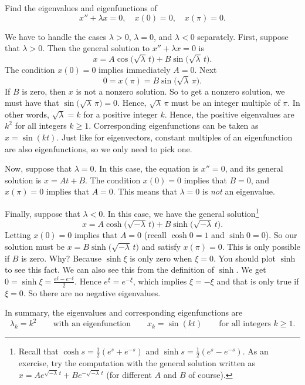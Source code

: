 \begin{example} \label{bvp:eig1ex}
Find the eigenvalues and eigenfunctions of
\begin{equation*}
x'' + \lambda x = 0, \quad x(0) = 0, \quad x(\pi) = 0 .
\end{equation*}

We have to handle
the cases $\lambda > 0$, $\lambda = 0$, and $\lambda < 0$ separately.
First, suppose that $\lambda > 0$.  Then
the general solution to $x''+\lambda x = 0$ is
\begin{equation*}
x = A \cos \bigl( \sqrt{\lambda}\, t\bigr)
+ B \sin \bigl( \sqrt{\lambda}\, t\bigr).
\end{equation*}
The condition $x(0) = 0$ implies immediately $A = 0$.
Next
\begin{equation*}
0 = x(\pi) = B \sin \bigl( \sqrt{\lambda}\, \pi \bigr) .
\end{equation*}
If $B$ is zero, then $x$ is not a nonzero solution.  So to get a nonzero
solution, we must have that $\sin \bigl( \sqrt{\lambda}\, \pi\bigr) = 0$.  Hence,
$\sqrt{\lambda}\, \pi$ must be an integer multiple of $\pi$.
In other words, $\sqrt{\lambda} = k$ for a positive integer $k$.
Hence, the positive eigenvalues are
$k^2$ for all integers $k \geq 1$.  Corresponding eigenfunctions
can be taken as $x=\sin (k t)$.  Just like for eigenvectors, constant
multiples of an eigenfunction are also eigenfunctions,
so we only need to pick one.

Now, suppose that $\lambda = 0$.  In this case, the equation is $x'' = 0$,
and its general solution is $x = At + B$.  The condition $x(0) = 0$ implies
that $B=0$, and $x(\pi) = 0$ implies that $A = 0$.  This means that $\lambda
= 0$ is \emph{not} an eigenvalue.

Finally, suppose that $\lambda < 0$.  In this case, we have the general
solution\footnote{Recall that
$\cosh s = \frac{1}{2}(e^s+e^{-s})$
and
$\sinh s = \frac{1}{2}(e^s-e^{-s})$.  As an exercise,
try the computation with the general solution written as
$x = A e^{\sqrt{-\lambda}\, t} + B e^{-\sqrt{-\lambda}\, t}$ (for
different $A$ and $B$ of course).}
\begin{equation*}
x = A \cosh \bigl( \sqrt{-\lambda}\, t\bigr)
+ B \sinh \bigl( \sqrt{-\lambda}\, t \bigr) .
\end{equation*}
Letting $x(0) = 0$ implies that $A = 0$ (recall $\cosh 0 = 1$ and $\sinh 0 =
0$).  So our solution must be $x = B \sinh \bigl( \sqrt{-\lambda}\, t \bigr)$ and satisfy
$x(\pi) = 0$.  This is only possible if $B$ is zero.  Why?  Because
$\sinh \xi$ is only zero when $\xi=0$.  You should plot $\sinh$ to see this
fact.
We can also see this from the definition of $\sinh$.
We get $0 = \sinh \xi = \frac{e^\xi -
e^{-\xi}}{2}$.  Hence $e^\xi = e^{-\xi}$, which implies $\xi = -\xi$ and that is only
true if $\xi=0$.  So there are no negative eigenvalues.

In summary, the eigenvalues and corresponding eigenfunctions are
\begin{equation*}
\lambda_k = k^2 \qquad \text{with an eigenfunction} \qquad x_k = \sin (k t)
\qquad \text{for all integers } k \geq 1 .
\end{equation*}
\end{example}

